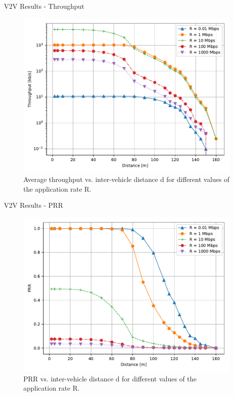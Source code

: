 \documentclass{beamer}
\begin{document}
	\begin{frame}{V2V Results - Throughput}
		\begin{figure}
			\includegraphics[scale=0.5]{throughput_distance_wave_UDP}
			\caption{Average throughput vs. inter-vehicle distance d for different values of the application rate R.}
		\end{figure}
	\end{frame}

	\begin{frame}{V2V Results - PRR}
		\begin{figure}
			\includegraphics[scale=0.5]{PRR_distance_wave_UDP}
			\caption{PRR vs. inter-vehicle distance d for different values of the application rate R.}
		\end{figure}
	\end{frame}
\end{document}

